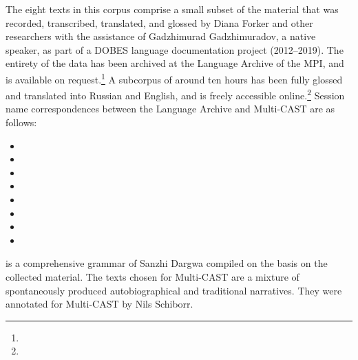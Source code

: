 The eight texts in this corpus comprise a small subset of the material that was recorded, transcribed, translated, and glossed by Diana Forker and other researchers with the assistance of Gadzhimurad Gadzhimuradov, a native speaker, as part of a DOBES language documentation project (2012–2019). The entirety of the data has been archived at the Language Archive of the MPI, and is available on request.\footnote{} A subcorpus of around ten hours has been fully glossed and translated into Russian and English, and is freely accessible online.\footnote{} Session name correspondences between the Language Archive and Multi-CAST are as follows:
%
\begin{itemize}
	\TabPositions{5em}
	\item	{}		\tab	{}
	\item	{}		\tab	{}
	\item	{}		\tab	{}
	\item	{}		\tab	{}
	\item	{}		\tab	{}
	\item	{}		\tab	{}
	\item	{}	\tab	{}
	\item	{}		\tab	{}
\end{itemize}
%
 is a comprehensive grammar of Sanzhi Dargwa compiled on the basis on the collected material. The texts chosen for Multi-CAST are a mixture of spontaneously produced autobiographical and traditional narratives. They were annotated for Multi-CAST by Nils Schiborr.



